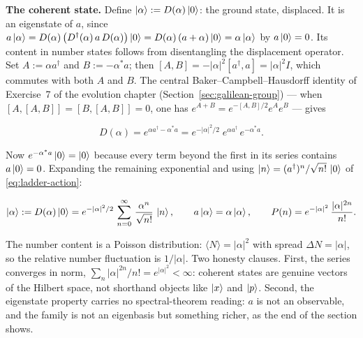 \textbf{The coherent state.} Define $\ket{\alpha} := D(\alpha)\ket{0}$: the ground state, displaced. It is an eigenstate of $a$, since $a\ket{\alpha} = D(\alpha)\,\bigl(D^\dagger(\alpha)\,a\,D(\alpha)\bigr)\ket{0} = D(\alpha)\,(a + \alpha)\ket{0} = \alpha\ket{\alpha}$ by $a\ket{0} = 0$. Its content in number states follows from disentangling the displacement operator. Set $A:=\alpha a^\dagger$ and $B:=-\alpha^{*}a$; then $[A,B]=-\lvert\alpha\rvert^2[a^\dagger,a]=\lvert\alpha\rvert^2 I$, which commutes with both $A$ and $B$. The central Baker--Campbell--Hausdorff identity of Exercise~7 of the evolution chapter (Section~\ref{sec:galilean-group}) --- when $[A,[A,B]]=[B,[A,B]]=0$, one has $e^{A+B}=e^{-[A,B]/2}e^{A}e^{B}$ --- gives
\begin{linenomath}
    \begin{equation*}
        D(\alpha) = e^{\alpha a^\dagger - \alpha^{*} a}
        = e^{-\lvert\alpha\rvert^2/2}\;e^{\alpha a^\dagger}\,e^{-\alpha^{*} a}.
    \end{equation*}
\end{linenomath}
Now $e^{-\alpha^{*} a}\ket{0} = \ket{0}$ because every term beyond the first in its series contains $a\ket{0}=0$. Expanding the remaining exponential and using $\ket{n} = (a^\dagger)^n/\sqrt{n!}\,\ket{0}$ of \eqref{eq:ladder-action}:
\begin{linenomath}
    \begin{equation}
        \ket{\alpha} := D(\alpha)\ket{0} = e^{-|\alpha|^2/2}\,\sum_{n=0}^{\infty}\,\frac{\alpha^n}{\sqrt{n!}}\,\ket{n},
        \qquad
        a\ket{\alpha} = \alpha\ket{\alpha},
        \qquad
        P(n) = e^{-|\alpha|^2}\,\frac{|\alpha|^{2n}}{n!}.
        \label{eq:coherent-state}
    \end{equation}
\end{linenomath}
The number content is a Poisson distribution: $\langle N\rangle = |\alpha|^2$ with spread $\Delta N = |\alpha|$, so the relative number fluctuation is $1/|\alpha|$. Two honesty clauses. First, the series converges in norm, $\sum_n |\alpha|^{2n}/n! = e^{|\alpha|^2} < \infty$: coherent states are genuine vectors of the Hilbert space, not shorthand objects like $\ket{x}$ and $\ket{p}$. Second, the eigenstate property carries no spectral-theorem reading: $a$ is not an observable, and the family is not an eigenbasis but something richer, as the end of the section shows.

